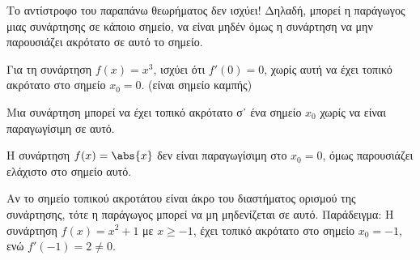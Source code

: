 \begin{rem}
\item {}
  \begin{myitemize}
    \item Το αντίστροφο του παραπάνω θεωρήματος δεν ισχύει! Δηλαδή, μπορεί η 
      παράγωγος μιας συνάρτησης σε κάποιο σημείο, να είναι μηδέν όμως η συνάρτηση να 
      μην παρουσιάζει ακρότατο σε αυτό το σημείο. 
      \begin{example}
      Για τη συνάρτηση $ f(x)=x^{3} $, ισχύει ότι $ f'(0)=0 $, χωρίς αυτή να έχει τοπικό 
      ακρότατο στο σημείο $ x_{0}=0 $. (είναι σημείο καμπής)

      \end{example}

    \item Μια συνάρτηση μπορεί να έχει τοπικό ακρότατο σ᾽ ένα σημείο $ x_{0} $ χωρίς 
      να είναι παραγωγίσιμη σε αυτό.  
      \begin{example}
      Η συνάρτηση $ f(x)= \abs{x} $ δεν είναι παραγωγίσιμη στο $ x_{0}=0 $, 
      όμως παρουσιάζει ελάχιστο στο σημείο αυτό.

      \end{example}

    \item Αν το σημείο τοπικού ακροτάτου είναι άκρο του διαστήματος ορισμού της 
      συνάρτησης, τότε η παράγωγος μπορεί να μη μηδενίζεται σε αυτό. Παράδειγμα: Η 
      συνάρτηση $ f(x) = x^{2}+1 $ με $ x \geq -1 $, έχει τοπικό ακρότατο στο σημείο 
      $ x_{0}=-1 $, ενώ $ f'(-1)=2 \neq 0 $.
  \end{myitemize}
\end{rem}

